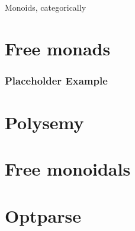 \documentclass[10pt]{beamer}
\begin{document}
\begin{frame}
  Monoids, categorically


\end{frame}


\section{Free monads}
\begin{frame}[fragile]
  \frametitle{Placeholder Example}
\end{frame}




\section{Polysemy}


\section{Free monoidals}


\section{Optparse}


% 
% 
\end{document}
